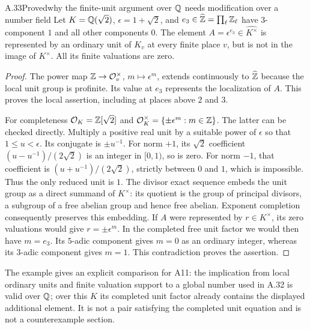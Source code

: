 \begin{statement}{A.33}{Proved}{why the finite-unit argument over $\mathbb Q$ needs modification over a number field}
Let $K=\mathbb Q(\sqrt2)$, $\epsilon=1+\sqrt2$, and
$e_3\in\widehat{\mathbb Z}=\prod_\ell\mathbb Z_\ell$ have $3$-component $1$
and all other components $0$. The element
$A=\epsilon^{e_3}\in\widehat{K^\times}$ is represented by an
ordinary unit of $K_v$ at every finite place $v$, but is not in the
image of $K^\times$. All its finite valuations are zero.
\end{statement}
\begin{proof}
The power map $\mathbb Z\to\mathcal O_v^\times$, $m\mapsto\epsilon^m$,
extends continuously to $\widehat{\mathbb Z}$ because the local unit group
is profinite. Its value at $e_3$ represents the localization of $A$.
This proves the local assertion, including at places above $2$ and
$3$.

For completeness $\mathcal O_K=\mathbb Z[\sqrt2]$ and
$\mathcal O_K^\times=\{\pm\epsilon^m:m\in\mathbb Z\}$. The latter can
be checked directly. Multiply a positive real unit by a suitable
power of $\epsilon$ so that $1\le u<\epsilon$. Its conjugate is
$\pm u^{-1}$. For norm $+1$, its $\sqrt2$ coefficient
$(u-u^{-1})/(2\sqrt2)$ is an integer in $[0,1)$, so is zero.
For norm $-1$, that coefficient is
$(u+u^{-1})/(2\sqrt2)$, strictly between $0$ and $1$, which is
impossible. Thus the only reduced unit is $1$.
The divisor exact sequence embeds the unit group as a direct summand
of $K^\times$: its quotient is the group of principal divisors,
a subgroup of a free abelian group and hence free abelian. Exponent
completion consequently preserves this embedding.
If $A$ were represented by $r\in K^\times$, its zero valuations
would give $r=\pm\epsilon^m$. In the completed free unit factor we
would then have $m=e_3$. Its $5$-adic component gives $m=0$ as an
ordinary integer, whereas its $3$-adic component gives $m=1$.
This contradiction proves the assertion.
\end{proof}
The example gives an explicit comparison for A11: the implication
from local ordinary units and finite valuation support to a global
number used in A.32 is valid over $\mathbb Q$; over this $K$ its completed
unit factor already contains the displayed additional element.
It is not a pair satisfying the completed unit equation and is not
a counterexample section.
